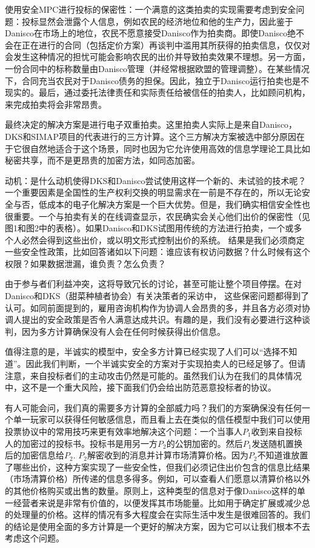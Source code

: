 {\heiti 使用安全MPC进行投标的保密性}：一个满意的这类拍卖的实现需要考虑到安全问题：投标显然会泄露个人信息，例如农民的经济地位和他的生产力，因此鉴于Danisco在市场上的地位，农民不愿意接受Danisco作为拍卖商。即使Danisco绝不会在正在进行的合同（包括定价方案）再谈判中滥用其所获得的拍卖信息，仅仅对会发生这种情况的担忧可能会影响农民的出价并导致拍卖效果不理想。另一方面，一份合同中的标称数量由Danisco管理（并经常根据欧盟的管理调整）。在某些情况下，合同充当农民对于Danisco债务的担保。因此，独立于Danisco运行拍卖也是不现实的。最后，通过委托法律责任和实际责任给被信任的拍卖人，比如顾问机构，来完成拍卖将会非常昂贵。

最终决定的解决方案是进行电子双重拍卖。这里拍卖人实际上是来自Danisco，DKS和SIMAP项目的代表进行的三方计算。这个三方解决方案被选中部分原因在于它很自然地适合于这个场景，同时也因为它允许使用高效的信息学理论工具比如秘密共享，而不是更昂贵的加密方法，如同态加密。

{\heiti 动机}：是什么动机使得DKS和Danisco尝试使用这样一个新的、未试验的技术呢？一个重要因素是全国性的生产权利交换的明显需求在一前是不存在的，所以无论安全与否，低成本的电子化解决方案是一个巨大优势。但是，我们确实相信安全性也很重要。一个与拍卖有关的在线调查显示，农民确实会关心他们出价的保密性（见图1和图2中的表格）。如果Danisco和DKS试图用传统的方法进行拍卖，一个或多个人必然会得到这些出价，或以明文形式控制出价的系统。 结果是我们必须商定一些安全性政策，比如回答诸如以下问题：谁应该有权访问数据？什么时候有这个权限？如果数据泄漏，谁负责？怎么负责？

由于参与者们利益冲突，这将导致冗长的讨论，甚至可能让整个项目停摆。在对Danisco和DKS（甜菜种植者协会）有关决策者的采访中，
这些保密问题都得到了认可。如同前面提到的，雇用咨询机构作为协调人会昂贵的多，并且各方必须对协调人提出的安全政策是否令人满意达成共识。有趣的是，我们没有必要进行这种谈判，因为多方计算确保没有人会在任何时候获得出价信息。

值得注意的是，半诚实的模型中，安全多方计算已经实现了人们可以“选择不知道”。因此我们判断，一个半诚实安全的方案对于实现拍卖人的已经足够了。但请注意，来自投标者们的主动攻击仍然是可能的。虽然我们认为在我们的具体情况中，这不是一个重大风险，接下面我们仍会给出防范恶意投标者的协议。

有人可能会问，我们真的需要多方计算的全部威力吗？我们的方案确保没有任何一个单一玩家可以获得任何敏感信息，而且看上去在类似的信任模型中我们可以使用投票协议中的常用技巧来更有效率地解决这个问题：一个当事人$P_1$收到来自投标人的加密过的投标书。投标书是用另一方$P_2$的公钥加密的。然后$P_1$发送随机置换后的加密信息给$P_2$. $P_2$解密收到的消息并计算市场清算价格。因为$P_2$不知道谁放置了哪些出价，这种方案实现了一些安全性，但我们必须记住出价包含的信息比结果（市场清算价格）所传递的信息多得多。例如，可以查看人们愿意以清算价格以外的其他价格购买或出售的数量。原则上，这种类型的信息对于像Danisco这样的单一经营者来说是非常有价值的，以便发挥其市场能量。比如用于确定扩展或减少总的处理量的价格。这样的情况有多大程度会在实际生活中发生是很难回答的。我们的结论是使用全面的多方计算是一个更好的解决方案，因为它可以让我们根本不去考虑这个问题。

